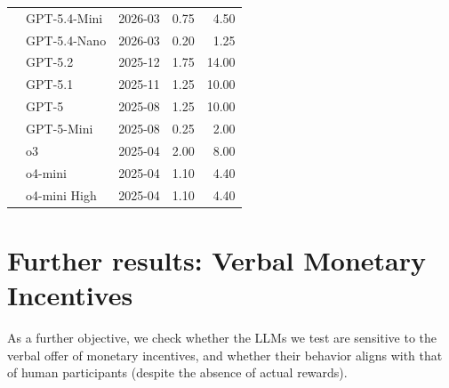 \documentclass[12pt,a4paper]{article}
\begin{document}
\begin{table}[h]
\begin{tabular}{@{}llcrr@{}}
                   & GPT-5.4-Mini               & 2026-03           & 0.75               & 4.50                \\
                   & GPT-5.4-Nano               & 2026-03           & 0.20               & 1.25                \\
                   & GPT-5.2                   & 2025-12           & 1.75               & 14.00               \\
                   & GPT-5.1                   & 2025-11           & 1.25               & 10.00               \\
                   & GPT-5                     & 2025-08           & 1.25               & 10.00               \\
                   & GPT-5-Mini                 & 2025-08           & 0.25               & 2.00                \\
                   & o3                        & 2025-04           & 2.00               & 8.00                \\
                   & o4-mini                   & 2025-04           & 1.10               & 4.40                \\
                   & o4-mini High       & 2025-04           & 1.10               & 4.40                \\ \bottomrule
\end{tabular}
\end{table}

\clearpage
\section{Further results: Verbal Monetary Incentives}



As a further objective, we check whether the LLMs we test are sensitive to the verbal offer of monetary incentives, and whether their behavior aligns with that of human participants (despite the absence of actual rewards). 
\end{document}
